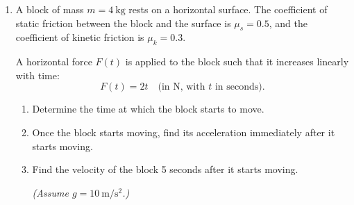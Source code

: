 \documentclass[12pt]{article}
\begin{document}
\begin{enumerate}
\item A block of mass $m = 4~\mathrm{kg}$ rests on a horizontal surface. The coefficient of static friction between the block and the surface is $\mu_s = 0.5$, and the coefficient of kinetic friction is $\mu_k = 0.3$.

A horizontal force $F(t)$ is applied to the block such that it increases linearly with time:
\[
F(t) = 2t \quad \text{(in N, with $t$ in seconds)}.
\]

\begin{enumerate}
    \item Determine the time at which the block starts to move.
    \item Once the block starts moving, find its acceleration immediately after it starts moving.
    \item Find the velocity of the block 5 seconds after it starts moving. 

\textit{(Assume $g = 10~\mathrm{m/s^2}$.)}
\end{enumerate}
          
\end{enumerate}
\end{document}
